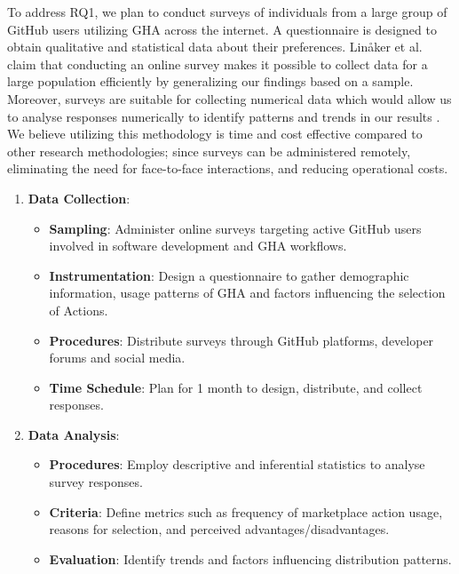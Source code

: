 \documentclass[conference]{IEEEtran}
\begin{document}
        To address RQ1, we plan to conduct surveys of individuals from a large group of GitHub users utilizing GHA across the internet. A questionnaire is designed to obtain qualitative and statistical data about their preferences. Linåker et al. \cite{linaker2013guidelines} claim that conducting an online survey makes it possible to collect data for a large population efficiently by generalizing our findings based on a sample. Moreover, surveys are suitable for collecting numerical data which would allow us to analyse responses numerically to identify patterns and trends in our results \cite{fowler2009survey}. We believe utilizing this methodology is time and cost effective compared to other research methodologies; since surveys can be administered remotely, eliminating the need for face-to-face interactions, and reducing operational costs.\\

        \begin{enumerate}
            \item \textbf{Data Collection}:\\
            \begin{itemize}
                \item \textbf{Sampling}: Administer online surveys targeting active GitHub users involved in software development and GHA workflows.
                \item \textbf{Instrumentation}: Design a questionnaire to gather demographic information, usage patterns of GHA and factors influencing the selection of Actions.
                \item \textbf{Procedures}: Distribute surveys through GitHub platforms, developer forums and social media.
                \item \textbf{Time Schedule}: Plan for 1 month to design, distribute, and collect responses.\\
            \end{itemize}
            
            \item \textbf{Data Analysis}:\\
            \begin{itemize}
                \item \textbf{Procedures}: Employ descriptive and inferential statistics to analyse survey responses.
                \item \textbf{Criteria}: Define metrics such as frequency of marketplace action usage, reasons for selection, and perceived advantages/disadvantages.
                \item \textbf{Evaluation}: Identify trends and factors influencing distribution patterns.\\
            \end{itemize}
        \end{enumerate}
\end{document}
